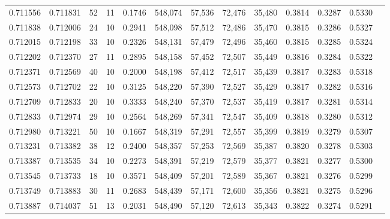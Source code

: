 \begin{tabular}{rrrrrrrrrrrrr}
0.711556 & 0.711831 &    52 &  11 &                                     0.1746 & 548,074 &  57,536 &  72,476 &  35,480 & 0.3814 & 0.3287 & 0.5330 \\
0.711838 & 0.712006 &    24 &  10 &                                     0.2941 & 548,098 &  57,512 &  72,486 &  35,470 & 0.3815 & 0.3286 & 0.5327 \\
0.712015 & 0.712198 &    33 &  10 &                                     0.2326 & 548,131 &  57,479 &  72,496 &  35,460 & 0.3815 & 0.3285 & 0.5324 \\
0.712202 & 0.712370 &    27 &  11 &                                     0.2895 & 548,158 &  57,452 &  72,507 &  35,449 & 0.3816 & 0.3284 & 0.5322 \\
0.712371 & 0.712569 &    40 &  10 &                                     0.2000 & 548,198 &  57,412 &  72,517 &  35,439 & 0.3817 & 0.3283 & 0.5318 \\
0.712573 & 0.712702 &    22 &  10 &                                     0.3125 & 548,220 &  57,390 &  72,527 &  35,429 & 0.3817 & 0.3282 & 0.5316 \\
0.712709 & 0.712833 &    20 &  10 &                                     0.3333 & 548,240 &  57,370 &  72,537 &  35,419 & 0.3817 & 0.3281 & 0.5314 \\
0.712833 & 0.712974 &    29 &  10 &                                     0.2564 & 548,269 &  57,341 &  72,547 &  35,409 & 0.3818 & 0.3280 & 0.5312 \\
0.712980 & 0.713221 &    50 &  10 &                                     0.1667 & 548,319 &  57,291 &  72,557 &  35,399 & 0.3819 & 0.3279 & 0.5307 \\
0.713231 & 0.713382 &    38 &  12 &                                     0.2400 & 548,357 &  57,253 &  72,569 &  35,387 & 0.3820 & 0.3278 & 0.5303 \\
0.713387 & 0.713535 &    34 &  10 &                                     0.2273 & 548,391 &  57,219 &  72,579 &  35,377 & 0.3821 & 0.3277 & 0.5300 \\
0.713545 & 0.713733 &    18 &  10 &                                     0.3571 & 548,409 &  57,201 &  72,589 &  35,367 & 0.3821 & 0.3276 & 0.5299 \\
0.713749 & 0.713883 &    30 &  11 &                                     0.2683 & 548,439 &  57,171 &  72,600 &  35,356 & 0.3821 & 0.3275 & 0.5296 \\
0.713887 & 0.714037 &    51 &  13 &                                     0.2031 & 548,490 &  57,120 &  72,613 &  35,343 & 0.3822 & 0.3274 & 0.5291 \\

\end{tabular}
